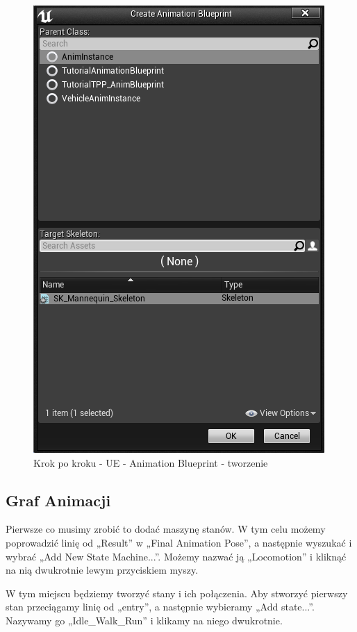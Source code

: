\documentclass[openright]{xmgr}
\begin{document}
\begin{figure}[!htb]
    \begin{center}
    \includegraphics[scale=0.75]{Screeny/UeKrokPoKroku/UE-AnimBPcreate.png}
    \end{center}
    \caption{Krok po kroku - UE - Animation Blueprint - tworzenie}
\end{figure}

\newpage
\subsection{Graf Animacji}
Pierwsze co musimy zrobić to dodać maszynę stanów. W tym celu możemy poprowadzić linię od „Result” w „Final Animation Pose”, a następnie wyszukać i wybrać „Add New State Machine...”. Możemy nazwać ją „Locomotion” i kliknąć na nią dwukrotnie lewym przyciskiem myszy.

W tym miejscu będziemy tworzyć stany i ich połączenia. Aby stworzyć pierwszy stan przeciągamy linię od „entry”, a następnie wybieramy „Add state...”. Nazywamy go „Idle\_Walk\_Run” i klikamy na niego dwukrotnie.
\end{document}
